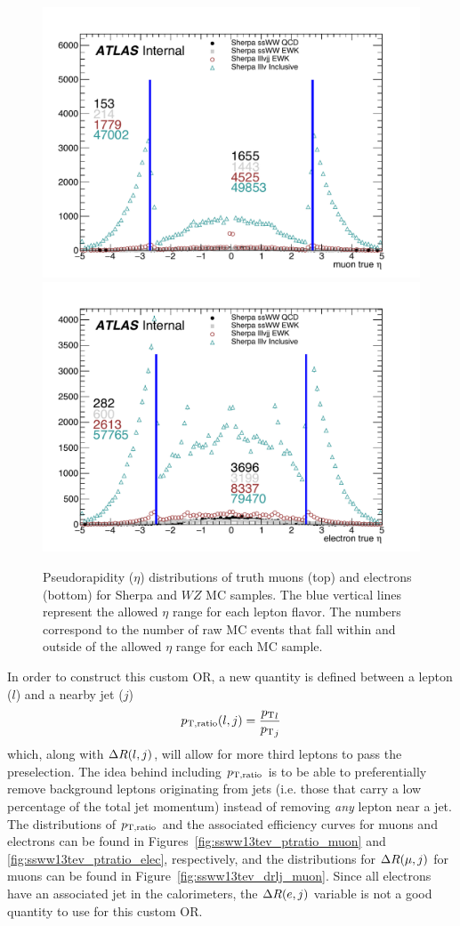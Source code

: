 \begin{figure}[htbp]
  \centering
  \includegraphics[width=.48\textwidth]{figs/ssww_13tev/custom_or/ExtraMuonEta_counted}
  \includegraphics[width=.48\textwidth]{figs/ssww_13tev/custom_or/ExtraElecEta_counted}
  \caption{Pseudorapidity ($\eta$) distributions of truth muons (top) and electrons (bottom) for Sherpa \ssww and $WZ$ MC samples.  The blue vertical lines represent the allowed $\eta$ range for each lepton flavor.  The numbers correspond to the number of raw MC events that fall within and outside of the allowed $\eta$ range for each MC sample.}
  \label{fig:ssww13tev_wzveto_truthlepeta}
\end{figure}

In order to construct this custom OR, a new quantity is defined between a lepton ($l$) and a nearby jet ($j$)
\begin{equation}
  \ptratio(l,j) = \frac{{\pt}_l}{{\pt}_j}%
  \label{eq:ssww13tev_ptratio}
\end{equation}
which, along with $\Delta R(l,j)$, will allow for more third leptons to pass the preselection.
The idea behind including $p_{\textrm{T},\textrm{ratio}}$ is to be able to preferentially remove background leptons originating from jets (i.e. those that carry a low percentage of the total jet momentum) instead of removing \emph{any} lepton near a jet.
The distributions of $p_{\textrm{T},\textrm{ratio}}$ and the associated efficiency curves for muons and electrons can be found in Figures~\ref{fig:ssww13tev_ptratio_muon} and \ref{fig:ssww13tev_ptratio_elec}, respectively, and the distributions for $\Delta R(\mu,j)$ for muons can be found in Figure~\ref{fig:ssww13tev_drlj_muon}.
Since all electrons have an associated jet in the calorimeters, the $\Delta R(e,j)$ variable is not a good quantity to use for this custom OR.

